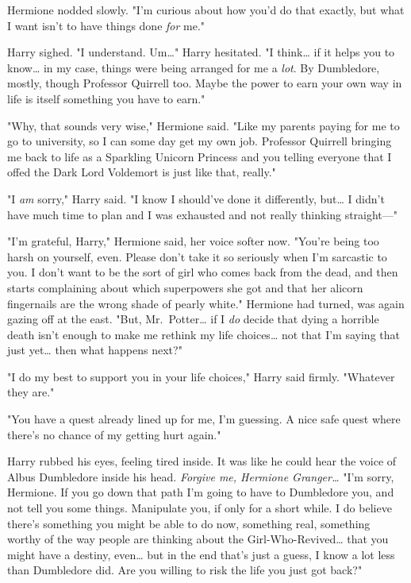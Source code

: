 Hermione nodded slowly. "I'm curious about how you'd do that exactly, but what
I want isn't to have things done \emph{for} me."

Harry sighed. "I understand. Um{\ldots}" Harry hesitated. "I think{\ldots} if
it helps you to know{\ldots} in my case, things were being arranged for me a
\emph{lot}. By Dumbledore, mostly, though Professor Quirrell too. Maybe the
power to earn your own way in life is itself something you have to earn."

"Why, that sounds very wise," Hermione said. "Like my parents paying for me
to go to university, so I can some day get my own job. Professor Quirrell
bringing me back to life as a Sparkling Unicorn Princess and you telling
everyone that I offed the Dark Lord Voldemort is just like that, really."

"I \emph{am} sorry," Harry said. "I know I should've done it differently,
but{\ldots} I didn't have much time to plan and I was exhausted and not really
thinking straight---"

"I'm grateful, Harry," Hermione said, her voice softer now. "You're being too
harsh on yourself, even. Please don't take it so seriously when I'm sarcastic to
you. I don't want to be the sort of girl who comes back from the dead, and then
starts complaining about which superpowers she got and that her alicorn
fingernails are the wrong shade of pearly white." Hermione had turned, was
again gazing off at the east. "But, Mr.~Potter{\ldots} if I \emph{do} decide
that dying a horrible death isn't enough to make me rethink my life
choices{\ldots} not that I'm saying that just yet{\ldots} then what happens
next?"

"I do my best to support you in your life choices," Harry said firmly.
"Whatever they are."

"You have a quest already lined up for me, I'm guessing. A nice safe quest
where there's no chance of my getting hurt again."

Harry rubbed his eyes, feeling tired inside. It was like he could hear the
voice of Albus Dumbledore inside his head. \emph{Forgive me, Hermione
Granger{\ldots}} "I'm sorry, Hermione. If you go down that path I'm going to
have to Dumbledore you, and not tell you some things. Manipulate you, if only
for a short while. I do believe there's something you might be able to do now,
something real, something worthy of the way people are thinking about the
Girl-Who-Revived{\ldots} that you might have a destiny, even{\ldots} but in the
end that's just a guess, I know a lot less than Dumbledore did. Are you willing
to risk the life you just got back?"

